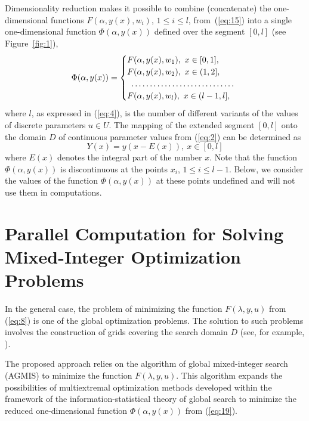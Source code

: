 \documentclass{svproc}
\begin{document}
Dimensionality reduction makes it possible to combine (concatenate) the one-dimensional functions $F(\alpha, y(x),w_i)$, $1 \leq i \leq l$, from~(\ref{eq:15}) into a single one-dimensional function $\Phi(\alpha,y(x))$ defined over the segment $[0,l]$ (see Figure~\ref{fig:1}),
\begin{equation}\label{eq:19}
 \Phi(\alpha,y(x)) =
\begin{cases}
F(\alpha,y(x),w_1 ),\ x \in [0,1], \\
F(\alpha,y(x),w_2 ),\ x \in (1,2], \\
\hdotsfor{1} \\
F(\alpha,y(x),w_l ),\ x \in (l-1,l],
\end{cases}
\end{equation}
where $l$, as expressed in (\ref{eq:4}), is the number of different variants of the values of discrete parameters $u \in U$.  The mapping of the extended segment $[0,l]$ onto the domain $D$ of continuous parameter values from (\ref{eq:2}) can be determined as
\begin{equation}\label{eq:20}
Y(x)=y(x-E(x)),\ x\in[0,l]
\end{equation}
where $E(x)$ denotes the integral part of the number $x$. Note that the function $\Phi(\alpha,y(x))$ is discontinuous at the points $x_i$, $1 \leq i \leq l-1$. Below, we consider the values of the function $\Phi(\alpha,y(x))$ at these points undefined and will not use them in computations.

\section{Parallel Computation for Solving Mixed-Integer Optimization Problems}\label{sec:4}

In the general case, the problem of minimizing the function $F(\lambda,y,u)$ from (\ref{eq:8}) is one of the global optimization problems. The solution to such problems involves the construction of grids covering the search domain $D$ (see, for example, \cite{c24,c25,c26,c27,c28,c29,c30,c31}).

The proposed approach relies on the algorithm of global mixed-integer search (AGMIS) to minimize the function $F(\lambda,y,u)$. This algorithm expands the possibilities of multiextremal optimization methods developed within the framework of the information-statistical theory of global search \cite{c19,c20,c21,c22,c23,c32,c33,c34,c35,c36,c37,c38,c39} to minimize the reduced one-dimensional function $\Phi(\alpha,y(x))$ from (\ref{eq:19}).
\end{document}
